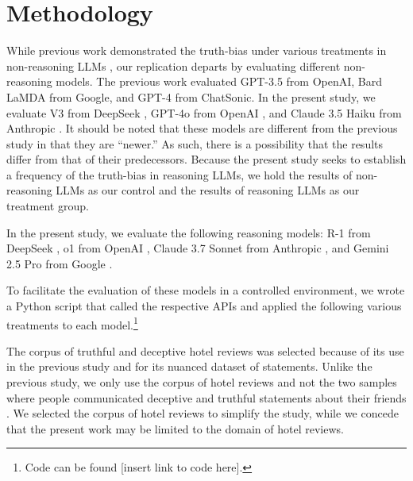 \documentclass{article}
\begin{document}
\section{Methodology}

While previous work demonstrated the truth-bias under various treatments in non-reasoning LLMs \citep{markowitz_generative_2024}, our replication departs by evaluating different non-reasoning models. The previous work evaluated GPT-3.5 from OpenAI, Bard LaMDA from Google, and GPT-4 from ChatSonic. In the present study, we evaluate V3 from DeepSeek \citep{deepseekai2025deepseekv3technicalreport}, GPT-4o from OpenAI \citep{openai2024gpt4ocard}, and Claude 3.5 Haiku from Anthropic \citep{anthropic_claude_2024}. It should be noted that these models are different from the previous study in that they are ``newer.'' As such, there is a possibility that the results differ from that of their predecessors. Because the present study seeks to establish a frequency of the truth-bias in reasoning LLMs, we hold the results of non-reasoning LLMs as our control and the results of reasoning LLMs as our treatment group.


In the present study, we evaluate the following reasoning models: R-1 from DeepSeek \citep{deepseek-ai_deepseek-r1_2025}, o1 from OpenAI \citep{openai_openai_2024}, Claude 3.7 Sonnet from Anthropic \citep{anthropic_claude_2025}, and Gemini 2.5 Pro from Google \citep{deepmindGemini}.

To facilitate the evaluation of these models in a controlled environment, we wrote a Python script that called the respective APIs and applied the following various treatments to each model.\footnote{Code can be found [insert link to code here].} %

The corpus of truthful and deceptive hotel reviews \citep{ott_finding_2011} was selected because of its use in the previous study \citep{markowitz_generative_2024} and for its nuanced dataset of statements. Unlike the previous study, we only use the corpus of hotel reviews \citep{ott_finding_2011} and not the two samples where people communicated deceptive and truthful statements about their friends \citep{markowitz_when_2020, lloyd_miami_2019}. We selected the corpus of hotel reviews to simplify the study, while we concede that the present work may be limited to the domain of hotel reviews.
\end{document}
